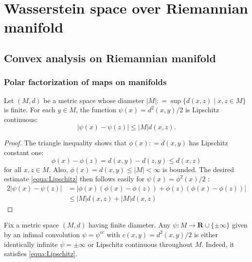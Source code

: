 \chapter{Wasserstein space over Riemannian manifold}
\section{Convex analysis on Riemannian manifold}
\subsection{Polar factorization of maps on manifolds}

\begin{lem} 
	\label{lem:Lipschitz_cost}
	Let \( ( M , d ) \) be a metric space whose diameter \( | M | : = \sup \{ d ( x , z ) \mid x , z \in M \} \) is finite.
	For each \( y \in M \), the function \( \psi ( x ) = d ^ { 2 } ( x , y ) / 2 \) is Lipschitz continuous:
	\begin{equation}
		\label{equa:Lipschitz}
		| \psi ( x ) - \psi ( z ) | \leq | M | d ( x , z ).
	\end{equation}
\end{lem}

\begin{proof}
	The triangle inequality shows that \( \phi ( x ) : = d ( x , y ) \) has Lipschitz constant one:
	\[ \phi ( x ) - \phi ( z ) = d ( x , y ) - d ( z , y ) \leq d ( x , z ) \]
	for all \( x , z \in M\).
	Also, \( \phi ( x ) = d ( x , y ) \leq | M | < \infty \) is bounded.
	The desired estimate \cref{equa:Lipschitz} then follows easily for \( \psi ( x ) = \phi ^ { 2 } ( x ) / 2 \) :
	\begin{align*}
		2 | \psi ( x ) - \psi ( z ) | & = | \phi ( x ) ( \phi ( x ) - \phi ( z ) ) + \phi ( z ) ( \phi ( x ) - \phi ( z ) ) | \\
		                              & \leq | M | d ( x , z ) + | M | d ( x , z )
	\end{align*}
\end{proof}

\begin{lem} 
	\label{lem:infimal_convolution_Lipschitz}
	Fix a metric space \( ( M , d ) \) having finite diameter.
	Any \( \psi : M \rightarrow \mathbf { R } \cup \{ \pm \infty \} \) given by an infimal convolution \( \psi = \psi ^ { c c } \) with \( c ( x , y ) = d ^ { 2 } ( x , y ) / 2 \) is either identically infinite \( \psi = \pm \infty \) or Lipschitz continuous throughout \( M\).
	Indeed, it satisfies \cref{equa:Lipschitz}.
\end{lem}


